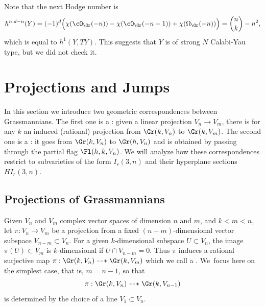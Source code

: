 Note that the next Hodge number is
\[
h^{n,d-n}(Y)= (-1)^d\Big(\chi(\cO_{\Gr}(-n))-\chi(\cO_{\Gr}(-n-1))+\chi(\Omega_{\Gr}(-n))\Big)=\binom{n}{k}-n^2,
\]
which is equal to $h^1(Y,TY)$. This suggests that $Y$ is of strong $N$ Calabi-Yau type,
but we did not check it.

\section{Projections and Jumps}\label{sect:proj-jump}
In this section we introduce two geometric correspondences between Grassmannians. The first one
is a : given a linear projection $V_n\to V_m$, there is for any $k$ an induced (rational) projection from $\Gr(k,V_n)$ to $\Gr(k,V_m)$. The second one is a : it goes from $\Gr(k,V_n)$ to $\Gr(h,V_n)$ and is obtained by passing through the partial flag $\Fl(h,k,V_n)$. We will analyze how these correspondences restrict to subvarieties of the form $I_r(3,n)$ and their hyperplane sections $HI_r(3,n)$.

\subsection{Projections of Grassmannians}
Given $V_n$ and $V_m$ complex vector spaces of dimension $n$ and $m$, and $k< m < n$, let
$\pi: V_n \to V_m$ be a projection from a fixed \hbox{$(n-m)$}\nobreakdash-dimensional vector subspace $V_{n-m} \subset V_n$. For a given $k$-dimensional subspace $U \subset V_n$, the image $\pi(U) \subset V_m$ is $k$-dimensional if $U \cap V_{n-m} = 0$. Thus $\pi$ induces a ratio\-nal surjective map $\pi: \Gr(k,V_n) \dashrightarrow \Gr(k,V_m)$ which we call a . We~\hbox{focus} here on the simplest case, that is, $m=n-1$, so that
\[
\pi: \Gr(k,V_n) \dashrightarrow \Gr(k,V_{n-1})
\]
is determined by the choice of a line $V_1 \subset V_n$.


